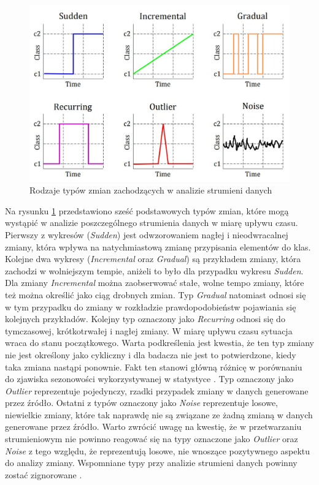 \begin{figure}[h] 
    \centering
    \includegraphics[width=14cm]{figures/types_of_drift2.JPG}
    \caption{Rodzaje typów zmian zachodzących w analizie strumieni danych \cite{Article:DriftType4}}\label{Figure:DriftTypes}
\end{figure}

\noindent Na rysunku \ref{Figure:DriftTypes} przedstawiono sześć podstawowych typów zmian, które mogą wystąpić w analizie poszczególnego strumienia danych w miarę upływu czasu. Pierwszy z wykresów (\textit{Sudden}) jest odwzorowaniem nagłej i nieodwracalnej zmiany, która wpływa na natychmiastową zmianę przypisania elementów do klas. Kolejne dwa wykresy (\textit{Incremental} oraz \textit{Gradual}) są przykładem zmiany, która zachodzi w wolniejszym tempie, aniżeli to było dla przypadku wykresu \textit{Sudden}. Dla zmiany \textit{Incremental} można zaobserwować stałe, wolne tempo zmiany, które też można określić jako ciąg drobnych zmian. Typ \textit{Gradual} natomiast odnosi się w tym przypadku do zmiany w rozkładzie prawdopodobieństw pojawiania się kolejnych przykładów. Kolejny typ oznaczony jako \textit{Recurring} odnosi się do tymczasowej, krótkotrwałej i nagłej zmiany. W miarę upływu czasu sytuacja wraca do stanu początkowego. Warta podkreślenia jest kwestia, że ten typ zmiany nie jest określony jako cykliczny i dla badacza nie jest to potwierdzone, kiedy taka zmiana nastąpi ponownie. Fakt ten stanowi główną różnicę w porównaniu do zjawiska sezonowości wykorzystywanej w statystyce \cite{PHD:Zliobaite}. Typ oznaczony jako \textit{Outlier} reprezentuje pojedynczy, rzadki przypadek zmiany w danych generowane przez źródło. Ostatni z typów oznaczony jako \textit{Noise} reprezentuje losowe, niewielkie zmiany, które tak naprawdę nie są związane ze żadną zmianą w danych generowane przez źródło. Warto zwrócić uwagę na kwestię, że w przetwarzaniu strumieniowym nie powinno reagować się na typy oznaczone jako \textit{Outlier} oraz \textit{Noise} z tego względu, że reprezentują losowe, nie wnoszące pozytywnego aspektu do analizy zmiany. Wspomniane typy przy analizie strumieni danych powinny zostać zignorowane \cite{DBrzezinski}\cite{Prezentacja:Strumienie}.

